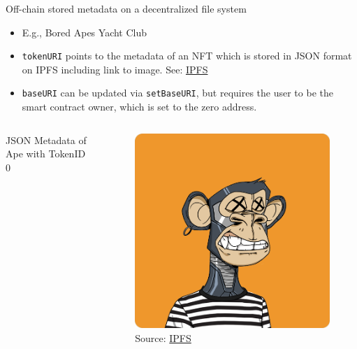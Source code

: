 \documentclass[handout]{beamer}
\begin{document}
\begin{frame}{Off-chain stored metadata on a decentralized file system}
	\begin{itemize}
		\item E.g., Bored Apes Yacht Club
		\item \texttt{tokenURI} points to the metadata of an NFT which is stored in JSON format on IPFS including link to image. See: \link \href{ipfs://QmeSjSinHpPnmXmspMjwiXyN6zS4E9zccariGR3jxcaWtq/1}{IPFS}
		\item \texttt{baseURI} can be updated via \texttt{setBaseURI}, but requires the user to be the smart contract owner, which is set to the zero address.
	\end{itemize} 
	\begin{columns}[T]
		\begin{column}{0.67\textwidth}
		\vspace{-1em}
			\begin{samplecode}{JSON Metadata of Ape with TokenID 0}
				
			\end{samplecode}		
		\end{column} %
		\begin{column}{0.35\textwidth}
			\begin{figure}
				\vspace{-1em}
				\centering
				\includegraphics[scale=0.18]{../assets/images/ape_0.png}
				\caption*{Source: \link \href{https://bafybeibnzhc7vp4hnfcocw7s2jej2tj5xqpwseyz3ifylismh47cr45rhm.ipfs.dweb.link/}{IPFS}}	
			\end{figure}
		\end{column}
	\end{columns}
\end{frame}
\end{document}

